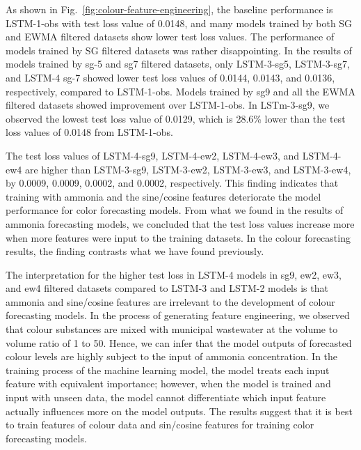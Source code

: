 As shown in Fig.~\ref{fig:colour-feature-engineering}, the baseline performance is LSTM-1-obs with test loss value of 0.0148, and many models trained by both SG and EWMA filtered datasets show lower test loss values. The performance of models trained by SG filtered datasets was rather disappointing. In the results of models trained by sg-5 and sg7 filtered datasets, only LSTM-3-sg5, LSTM-3-sg7, and LSTM-4 sg-7 showed lower test loss values of 0.0144, 0.0143, and 0.0136, respectively, compared to LSTM-1-obs. Models trained by sg9 and all the EWMA filtered datasets showed improvement over LSTM-1-obs. In LSTm-3-sg9, we observed the lowest test loss value of 0.0129, which is 28.6\% lower than the test loss values of 0.0148 from LSTM-1-obs. 

The test loss values of LSTM-4-sg9, LSTM-4-ew2, LSTM-4-ew3, and LSTM-4-ew4 are higher than LSTM-3-sg9, LSTM-3-ew2, LSTM-3-ew3, and LSTM-3-ew4, by 0.0009, 0.0009, 0.0002, and 0.0002, respectively. This finding indicates that training with ammonia and the sine/cosine features deteriorate the model performance for color forecasting models. From what we found in the results of ammonia forecasting models, we concluded that the test loss values increase more when more features were input to the training datasets. In the colour forecasting results, the finding contrasts what we have found previously. 

The interpretation for the higher test loss in LSTM-4 models in sg9, ew2, ew3, and ew4 filtered datasets compared to LSTM-3 and LSTM-2 models is that ammonia and sine/cosine features are irrelevant to the development of colour forecasting models. In the process of generating feature engineering, we observed that colour substances are mixed with municipal wastewater at the volume to volume ratio of 1 to 50. Hence, we can infer that the model outputs of forecasted colour levels are highly subject to the input of ammonia concentration. In the training process of the machine learning model, the model treats each input feature with equivalent importance; however, when the model is trained and input with unseen data, the model cannot differentiate which input feature actually influences more on the model outputs. The results suggest that it is best to train features of colour data and sin/cosine features for training color forecasting models.


